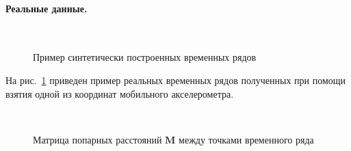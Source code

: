 \documentclass[12pt, twoside]{article}
\begin{document}
\paragraph{Реальные данные.}
\begin{figure}[h!t]\center
{}
\\
\caption{Пример синтетически построенных временных рядов}
\label{fig_real_series}
\end{figure}

На рис.~\ref{fig_real_series} приведен пример реальных временных рядов полученных при помощи взятия одной из координат мобильного акселерометра. 

\begin{figure}[h!t]\center
{}
\\
\caption{Матрица попарных расстояний $\textbf{M}$ между точками временного ряда}
\label{fig_real_distance}
\end{figure}
\end{document}

